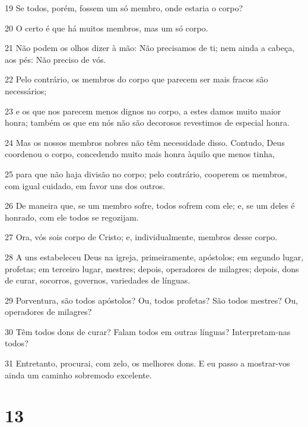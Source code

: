 \par 19 Se todos, porém, fossem um só membro, onde estaria o corpo?
\par 20 O certo é que há muitos membros, mas um só corpo.
\par 21 Não podem os olhos dizer à mão: Não precisamos de ti; nem ainda a cabeça, aos pés: Não preciso de vós.
\par 22 Pelo contrário, os membros do corpo que parecem ser mais fracos são necessários;
\par 23 e os que nos parecem menos dignos no corpo, a estes damos muito maior honra; também os que em nós não são decorosos revestimos de especial honra.
\par 24 Mas os nossos membros nobres não têm necessidade disso. Contudo, Deus coordenou o corpo, concedendo muito mais honra àquilo que menos tinha,
\par 25 para que não haja divisão no corpo; pelo contrário, cooperem os membros, com igual cuidado, em favor uns dos outros.
\par 26 De maneira que, se um membro sofre, todos sofrem com ele; e, se um deles é honrado, com ele todos se regozijam.
\par 27 Ora, vós sois corpo de Cristo; e, individualmente, membros desse corpo.
\par 28 A uns estabeleceu Deus na igreja, primeiramente, apóstolos; em segundo lugar, profetas; em terceiro lugar, mestres; depois, operadores de milagres; depois, dons de curar, socorros, governos, variedades de línguas.
\par 29 Porventura, são todos apóstolos? Ou, todos profetas? São todos mestres? Ou, operadores de milagres?
\par 30 Têm todos dons de curar? Falam todos em outras línguas? Interpretam-nas todos?
\par 31 Entretanto, procurai, com zelo, os melhores dons. E eu passo a mostrar-vos ainda um caminho sobremodo excelente.

\chapter{13}


